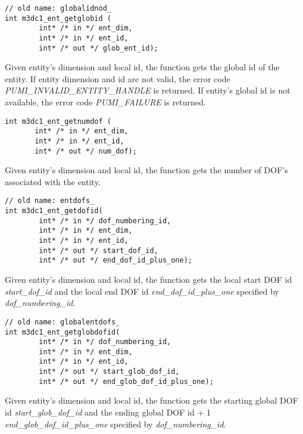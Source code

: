 \begin{verbatim}
// old name: globalidnod_
int m3dc1_ent_getglobid (
        int* /* in */ ent_dim, 
        int* /* in */ ent_id, 
        int* /* out */ glob_ent_id); 
\end{verbatim}\vspace{-.5cm}\hspace{1cm}

Given entity's dimension and local id, the function gets the global id of the entity. If entity dimension and id are not valid, the error code \emph{PUMI\_INVALID\_ENTITY\_HANDLE} is returned. If entity's global id is not available, the error code \emph{PUMI\_FAILURE} is returned.


\begin{verbatim}
int m3dc1_ent_getnumdof (
       int* /* in */ ent_dim, 
       int* /* in */ ent_id, 
       int* /* out */ num_dof);
\end{verbatim}\vspace{-.5cm}\hspace{1cm}
Given entity's dimension and local id, the function gets the number of DOF's associated with the entity.

\begin{verbatim}
// old name: entdofs_
int m3dc1_ent_getdofid(
        int* /* in */ dof_numbering_id, 
        int* /* in */ ent_dim, 
        int* /* in */ ent_id, 
        int* /* out */ start_dof_id, 
        int* /* out */ end_dof_id_plus_one); 
\end{verbatim}\vspace{-.5cm}\hspace{1cm}
 
Given entity's dimension and local id, the function gets the local start DOF id \textit{start\_dof\_id} and the local end DOF id \textit{end\_dof\_id\_plus\_one} specified by \textit{dof\_numbering\_id}. 

\begin{verbatim}
// old name: globalentdofs_
int m3dc1_ent_getglobdofid(
        int* /* in */ dof_numbering_id, 
        int* /* in */ ent_dim, 
        int* /* in */ ent_id, 
        int* /* out */ start_glob_dof_id, 
        int* /* out */ end_glob_dof_id_plus_one); 
\end{verbatim}\vspace{-.5cm}\hspace{1cm}
 
Given entity's dimension and local id, the function gets the starting global DOF id \textit{start\_glob\_dof\_id} and the ending global DOF id + 1 \textit{end\_glob\_dof\_id\_plus\_one} specified by \textit{dof\_numbering\_id}. 

